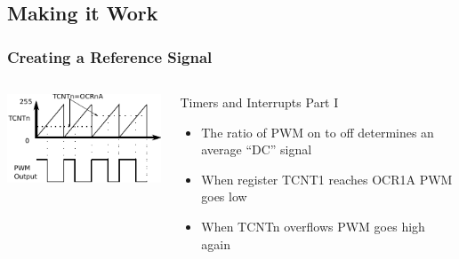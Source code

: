 \documentclass{beamer}
\begin{document}
\subsection{Making it Work}

\begin{frame}
\frametitle{Creating a Reference Signal}
\begin{columns}[t]
	\column[c]{6cm}
	    \includegraphics[scale=1.25]{Bitbang}
	    
	\column[c]{5cm}

	\begin{block}{Timers and Interrupts Part I}
	\begin{itemize}
	\item {The ratio of PWM on to off determines an average ``DC'' signal}
	\item{When register TCNT1 reaches OCR1A PWM goes low}
	\item {When TCNTn overflows PWM goes high again}
	\end{itemize}
	
	\end{block}
\end{columns}
\end{frame}
\end{document}
